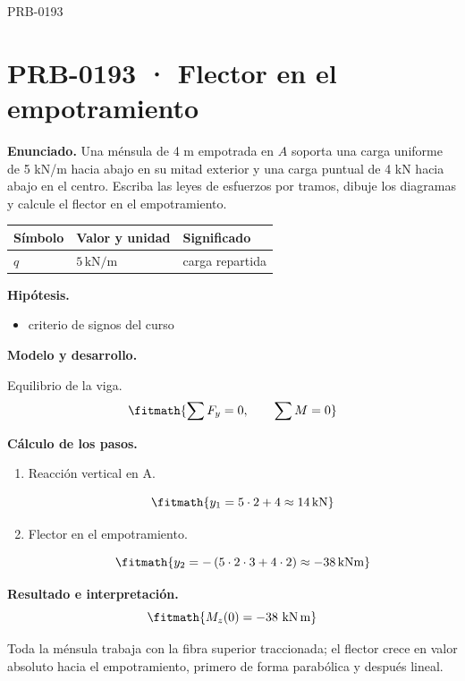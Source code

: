 \begin{studiumworked}{PRB-0193}

\section{PRB-0193 · Flector en el empotramiento}

\textbf{Enunciado.} Una ménsula de 4 m empotrada en $A$ soporta una carga uniforme de 5 kN/m hacia abajo en su mitad exterior y una carga puntual de 4 kN hacia abajo en el centro. Escriba las leyes de esfuerzos por tramos, dibuje los diagramas y calcule el flector en el empotramiento.

\par\medskip\noindent\begin{tabular}{@{}p{.18\linewidth}p{.26\linewidth}p{.48\linewidth}@{}}
\toprule Símbolo & Valor y unidad & Significado\\\midrule
$q$ & $5\,\mathrm{kN/m}$ & carga repartida\\
\bottomrule\end{tabular}\par\medskip

\textbf{Hipótesis.}\begin{itemize}\item criterio de signos del curso\end{itemize}

\textbf{Modelo y desarrollo.}

Equilibrio de la viga.\[\fitmath{\sum F_y = 0,\qquad \sum M = 0}\]

\textbf{Cálculo de los pasos.}

\begin{enumerate}

\item Reacción vertical en A.

\[\fitmath{y_{1}=5\cdot 2+4\approx 14\,\mathrm{kN}}\]

\item Flector en el empotramiento.

\[\fitmath{y_{2}=-\left(5\cdot 2\cdot 3+4\cdot 2\right)\approx -38\,\mathrm{kN m}}\]

\end{enumerate}

\textbf{Resultado e interpretación.}\[\fitmath{M_z(0) = -38\ \mathrm{kN\,m}}\]

Toda la ménsula trabaja con la fibra superior traccionada; el flector crece en valor absoluto hacia el empotramiento, primero de forma parabólica y después lineal.


\end{studiumworked}
